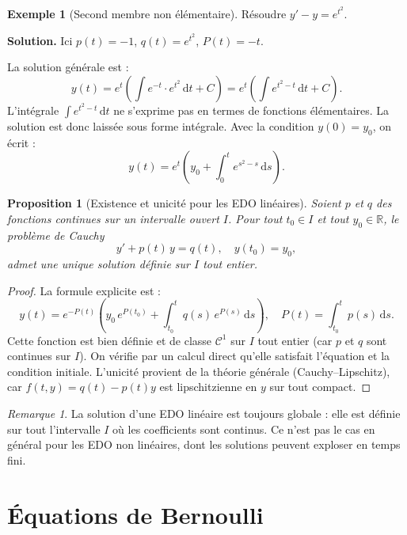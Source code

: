 \documentclass[12pt,a4paper,openany]{book}
\theoremstyle{definition}
\newtheorem{exemple}[definition]{Exemple}
\theoremstyle{plain}
\newtheorem{proposition}[definition]{Proposition}
\theoremstyle{remark}
\newtheorem{remarque}[definition]{Remarque}
\newcommand{\R}{\mathbb{R}}
\newcommand{\dd}{\mathrm{d}}
\begin{document}
\begin{exemple}[Second membre non élémentaire]
\label{ex:lineaire-2}
Résoudre $y' - y = e^{t^2}$.

\textbf{Solution.} Ici $p(t) = -1$, $q(t) = e^{t^2}$, $P(t) = -t$.

La solution générale est :
\[
y(t) = e^{t}\left(\int e^{-t}\cdot e^{t^2}\,\dd t + C\right) = e^{t}\left(\int e^{t^2 - t}\,\dd t + C\right).
\]
L'intégrale $\int e^{t^2 - t}\,\dd t$ ne s'exprime pas en termes de fonctions élémentaires. La solution est donc laissée sous forme intégrale. Avec la condition $y(0) = y_0$, on écrit :
\[
\boxed{y(t) = e^{t}\left(y_0 + \int_0^t e^{s^2 - s}\,\dd s\right).}
\]
\end{exemple}

\begin{proposition}[Existence et unicité pour les EDO linéaires]
\label{prop:existence-lineaire}
Soient $p$ et $q$ des fonctions continues sur un intervalle ouvert $I$. Pour tout $t_0 \in I$ et tout $y_0 \in \R$, le problème de Cauchy
\[
y' + p(t)\,y = q(t), \quad y(t_0) = y_0,
\]
admet une unique solution définie sur $I$ tout entier.
\end{proposition}

\begin{proof}
La formule explicite est :
\[
y(t) = e^{-P(t)}\left(y_0\,e^{P(t_0)} + \int_{t_0}^{t} q(s)\,e^{P(s)}\,\dd s\right), \quad P(t) = \int_{t_0}^{t} p(s)\,\dd s.
\]
Cette fonction est bien définie et de classe $\mathscr{C}^1$ sur $I$ tout entier (car $p$ et $q$ sont continues sur $I$). On vérifie par un calcul direct qu'elle satisfait l'équation et la condition initiale. L'unicité provient de la théorie générale (Cauchy--Lipschitz), car $f(t,y) = q(t) - p(t)y$ est lipschitzienne en $y$ sur tout compact.
\end{proof}

\begin{remarque}
\label{rem:lineaire-global}
La solution d'une EDO linéaire est toujours globale : elle est définie sur tout l'intervalle $I$ où les coefficients sont continus. Ce n'est pas le cas en général pour les EDO non linéaires, dont les solutions peuvent exploser en temps fini.
\end{remarque}

\section{Équations de Bernoulli}
\label{sec:bernoulli}
\end{document}
